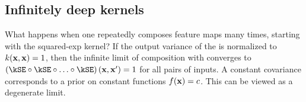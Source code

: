 \documentclass{article} %
\begin{document}
\subsection{Infinitely deep kernels}
What happens when one repeatedly composes feature maps many times, starting with the squared-exp kernel?
If the output variance of the \kSE{} is normalized to ${k({\bf{x}},{\bf{x}}) = 1}$, then the infinite limit of composition with \kSE{} converges to ${\left(\kSE \circ \kSE \circ \ldots \circ \kSE\right)(\vx,\vx') = 1}$ for all pairs of inputs.
A constant covariance corresponds to a prior on constant functions ${f({\bf{x}}) = c}$.
This can be viewed as a degenerate limit.

%

\end{document}
